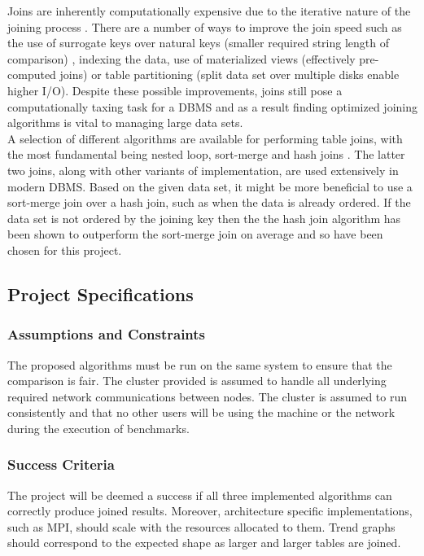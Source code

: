 \documentclass[10.5 pt, conference]{IEEEtran}
\begin{document}
Joins are inherently computationally expensive due to the iterative nature of the joining process \cite{Stephens2004}. There are a number of ways to improve the join speed such as the use of surrogate keys over natural keys (smaller required string length of comparison) , indexing the data, use of materialized views (effectively pre-computed joins) or table partitioning (split data set over multiple disks enable higher I/O)\cite{Stephens2004}. Despite these possible improvements, joins still pose a computationally taxing task for a DBMS and as a result finding optimized joining algorithms is vital to managing large data sets.\\

A selection of different algorithms are available for performing table joins, with the most fundamental being nested loop, sort-merge and hash joins \cite{Mishra1992}. The latter two joins, along with other variants of implementation, are used extensively in modern DBMS. Based on the given data set, it might be more beneficial to use a sort-merge join over a hash join, such as when the data is already ordered. If the data set is not ordered by the joining key then the the hash join algorithm has been shown to outperform the sort-merge join on average and so have been chosen for this project\cite{Stephens2004}.\\

\subsection{Project Specifications}

\subsubsection{Assumptions and Constraints} 
The proposed algorithms must be run on the same system to ensure that the comparison is fair. The cluster provided is assumed to handle all underlying required network communications between nodes. The cluster is assumed to run consistently and that no other users will be using the machine or the network during the execution of benchmarks. 

\subsubsection{Success Criteria} 
The project will be deemed a success if all three implemented algorithms can correctly produce joined results. Moreover, architecture specific implementations, such as MPI, should scale with the resources allocated to them. Trend graphs should correspond to the expected shape as larger and larger tables are joined.
\end{document}
